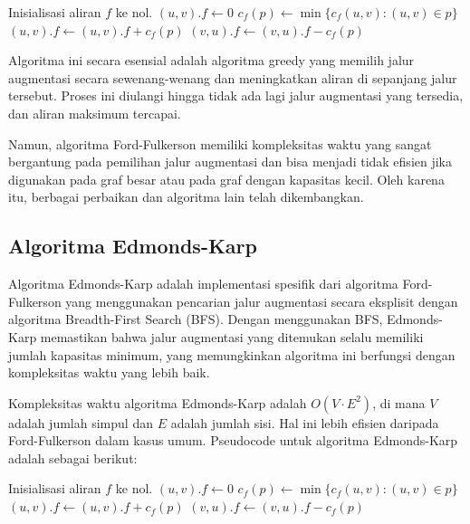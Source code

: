 \begin{algorithm}
\caption{Ford-Fulkerson}
\begin{algorithmic}[1]
\State Inisialisasi aliran \( f \) ke nol.
    \State \((u, v).f \gets 0\)
\EndFor
{}
    \State \( c_f(p) \gets \min \{ c_f(u, v) : (u, v) \in p \} \)
            \State \((u, v).f \gets (u, v).f + c_f(p)\)
        \Else
            \State \((v, u).f \gets (v, u).f - c_f(p)\)
        \EndIf
    \EndFor
\EndWhile
\end{algorithmic}
\end{algorithm}

Algoritma ini secara esensial adalah algoritma greedy yang memilih jalur augmentasi secara sewenang-wenang dan meningkatkan aliran di sepanjang jalur tersebut. Proses ini diulangi hingga tidak ada lagi jalur augmentasi yang tersedia, dan aliran maksimum tercapai.

Namun, algoritma Ford-Fulkerson memiliki kompleksitas waktu yang sangat bergantung pada pemilihan jalur augmentasi dan bisa menjadi tidak efisien jika digunakan pada graf besar atau pada graf dengan kapasitas kecil. Oleh karena itu, berbagai perbaikan dan algoritma lain telah dikembangkan.

\subsection{Algoritma Edmonds-Karp}
\label{subsubsec:edmondskarp}

Algoritma Edmonds-Karp adalah implementasi spesifik dari algoritma Ford-Fulkerson yang menggunakan pencarian jalur augmentasi secara eksplisit dengan algoritma Breadth-First Search (BFS). Dengan menggunakan BFS, Edmonds-Karp memastikan bahwa jalur augmentasi yang ditemukan selalu memiliki jumlah kapasitas minimum, yang memungkinkan algoritma ini berfungsi dengan kompleksitas waktu yang lebih baik.

Kompleksitas waktu algoritma Edmonds-Karp adalah \( O(V \cdot E^2) \), di mana \( V \) adalah jumlah simpul dan \( E \) adalah jumlah sisi. Hal ini lebih efisien daripada Ford-Fulkerson dalam kasus umum. Pseudocode untuk algoritma Edmonds-Karp adalah sebagai berikut:

\begin{algorithm}
\caption{Edmonds-Karp}
\begin{algorithmic}[1]
\State Inisialisasi aliran \( f \) ke nol.
    \State \((u, v).f \gets 0\)
\EndFor
{}
    \State \( c_f(p) \gets \min \{ c_f(u, v) : (u, v) \in p \} \)
            \State \((u, v).f \gets (u, v).f + c_f(p)\)
        \Else
            \State \((v, u).f \gets (v, u).f - c_f(p)\)
        \EndIf
    \EndFor
\EndWhile
\end{algorithmic}
\end{algorithm}

